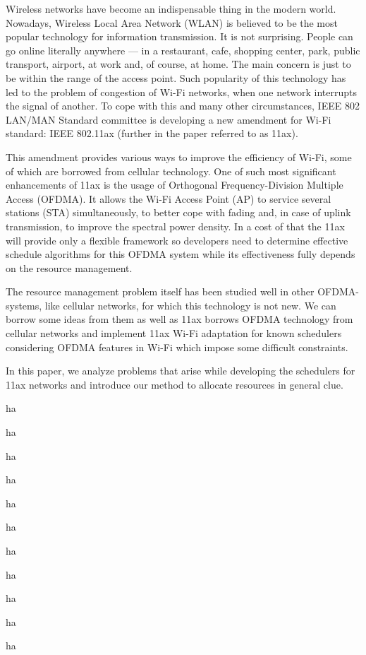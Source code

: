 Wireless networks have become an indispensable thing in the modern world.
Nowadays, Wireless Local Area Network (WLAN) is believed to be the most popular technology for information transmission. 
It is not surprising. 
People can go online literally anywhere --- in a restaurant, cafe, shopping center, park, public transport, airport, at work and, of course, at home. 
The main concern is just to be within the range of the access point. 
Such popularity of this technology has led to the problem of congestion of Wi-Fi networks, when one network interrupts the signal of another. 
To cope with this and many other circumstances, IEEE 802 LAN/MAN Standard committee is developing a new amendment for Wi-Fi standard: IEEE 802.11ax (further in the paper referred to as 11ax). 

This amendment provides various ways to improve the efficiency of Wi-Fi, some of which are borrowed from cellular technology.
One of such most significant enhancements of 11ax is the usa\-ge of Orthogonal Frequency-Division Multiple Access (OFDMA). 
It allows the Wi-Fi Access Point (AP) to service several stations (STA) simultaneously, to better cope with fading and, in case of uplink transmission, to improve the spectral power density. In a cost of that the 11ax will provide only a flexible framework so developers need to determine effective schedule algorithms for this OFDMA system while its effectiveness fully depends on the resource management.   

The resource management problem itself has been studied well in other OFDMA-systems, like cellular networks, for which this technology is not new. We can borrow some ideas from them as well as 11ax borrows OFDMA technology from cellular networks and implement 11ax Wi-Fi adaptation for known schedulers considering OFDMA features in Wi-Fi which impose some difficult constraints.  

In this paper, we analyze problems that arise while developing the schedulers for 11ax networks and introduce our method to allocate resources in general clue. 

ha

ha

ha

ha

ha

ha

ha

ha

ha

ha

ha

